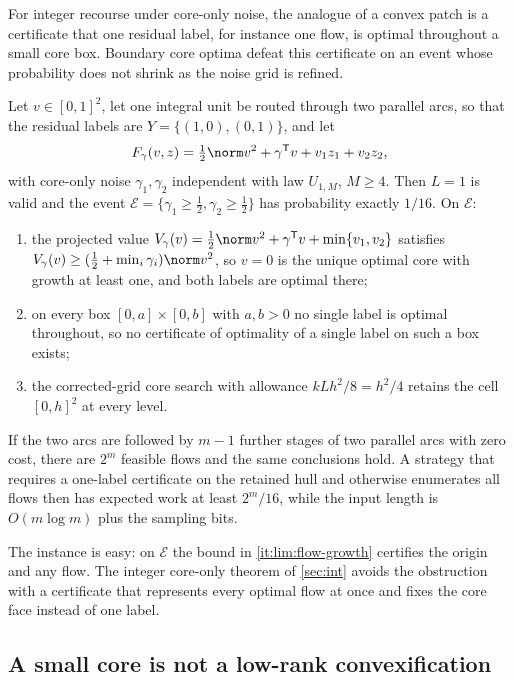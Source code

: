 For integer recourse under core-only noise, the analogue of a convex patch
is a certificate that one residual label, for instance one flow, is optimal
throughout a small core box. Boundary core optima defeat this certificate on
an event whose probability does not shrink as the noise grid is refined.

\begin{proposition}\label{prop:lim:flow}
Let $v\in[0,1]^2$, let one integral unit be routed through two parallel
arcs, so that the residual labels are $Y=\{(1,0),(0,1)\}$, and let
\[
 F_\gamma(v,z)=\tfrac12\norm v^2+\gamma^{\mathsf T}v+v_1z_1+v_2z_2 ,
\]
with core-only noise $\gamma_1,\gamma_2$ independent with law $U_{1,M}$,
$M\ge4$. Then $L=1$ is valid and the event
$\mathcal E=\{\gamma_1\ge\frac12,\gamma_2\ge\frac12\}$ has probability
exactly $1/16$. On $\mathcal E$:
\begin{enumerate}[label=(\alph*)]
\item\label{it:lim:flow-growth} the projected value
$V_\gamma(v)=\frac12\norm v^2+\gamma^{\mathsf T}v+\min\{v_1,v_2\}$
satisfies $V_\gamma(v)\ge(\frac12+\min_i\gamma_i)\norm v^2$, so $v=0$ is
the unique optimal core with growth at least one, and both labels are
optimal there;
\item\label{it:lim:flow-box} on every box $[0,a]\times[0,b]$ with $a,b>0$ no
single label is optimal throughout, so no certificate of optimality of a
single label on such a box exists;
\item\label{it:lim:flow-search} the corrected-grid core search with
allowance $kLh^2/8=h^2/4$ retains the cell $[0,h]^2$ at every level.
\end{enumerate}
If the two arcs are followed by $m-1$ further stages of two parallel arcs
with zero cost, there are $2^m$ feasible flows and the same conclusions hold.
A strategy that requires a one-label certificate on the retained hull and
otherwise enumerates all flows then has expected work at least $2^m/16$,
while the input length is $O(m\log m)$ plus the sampling bits.
\end{proposition}

The instance is easy: on $\mathcal E$ the bound in \ref{it:lim:flow-growth}
certifies the origin and any flow. The integer core-only theorem of
\cref{sec:int} avoids the obstruction with a certificate that represents
every optimal flow at once and fixes the core face instead of one label.

\subsection{A small core is not a low-rank convexification}\label{sec:lim:rank}

